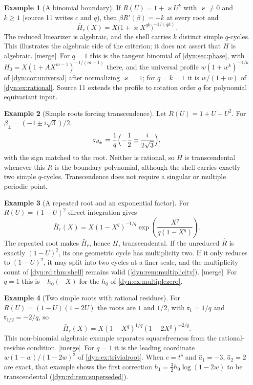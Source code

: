 \documentclass[11pt,letterpaper]{article}
\theoremstyle{definition}
\newtheorem{example}[example]{Example}
\theoremstyle{remark}
\newcommand{\mergetag}{\textup{\textsf{\small[merge]}}}%
\numberwithin{equation}{section}
\begin{document}
\begin{example}[A binomial boundary]\label{dyn:rd:ex:binomial}
If $R(U)=1+\varkappa U^{k}$ with $\varkappa\ne0$ and $k\ge1$ (source 11
writes $c$ and $q$), then $\beta R'(\beta)=-k$ at every root and
\[
 \bar H_r(X)=X\bigl(1+\varkappa X^{qk}\bigr)^{-1/(qk)} .
\]
The reduced linearizer is algebraic, and the shell carries $k$ distinct
simple $q$-cycles. This illustrates the algebraic side of the criterion; it
does not assert that $H$ is algebraic. \mergetag\ For $q=1$ this is the
tangent binomial of \cref{dyn:sec:phase}, with $H_0=X(1+AX^{m-1})^{-1/(m-1)}$
there, and the universal profile $w(1+w^{k})^{-1/k}$ of
\cref{dyn:cor:universal} after normalizing $\varkappa=1$; for $q=k=1$ it is
$w/(1+w)$ of \cref{dyn:ex:rational}. Source 11 extends the profile to
rotation order $q$ for polynomial equivariant input.
\end{example}

\begin{example}[Simple roots forcing transcendence]
\label{dyn:rd:ex:quadraticR}
Let $R(U)=1+U+U^{2}$. For $\beta_\pm=(-1\pm i\sqrt3)/2$,
\[
 \mathfrak r_{\beta_\pm}=\frac1q\Bigl(-\frac12\pm\frac{i}{2\sqrt3}\Bigr),
\]
with the sign matched to the root. Neither is rational, so $H$ is
transcendental whenever this $R$ is the boundary polynomial, although the
shell carries exactly two simple $q$-cycles. Transcendence does not require
a singular or multiple periodic point.
\end{example}

\begin{example}[A repeated root and an exponential factor]
\label{dyn:rd:ex:repeated}
For $R(U)=(1-U)^{2}$ direct integration gives
\[
 \bar H_r(X)=X(1-X^{q})^{-1/q}\exp\left(\frac{X^{q}}{q(1-X^{q})}\right).
\]
The repeated root makes $\bar H_r$, hence $H$, transcendental. If the
unreduced $\widehat R$ is exactly $(1-U)^{2}$, its one geometric cycle has
multiplicity two. If it only reduces to $(1-U)^{2}$, it may split into two
cycles at a finer scale, and the multiplicity count of
\cref{dyn:rd:thm:shell} remains valid (\cref{dyn:rem:multiplicity}).
\mergetag\ For $q=1$ this is $-h_0(-X)$ for the $h_0$ of
\cref{dyn:ex:multiplezero}.
\end{example}

\begin{example}[Two simple roots with rational residues]
\label{dyn:rd:ex:tworoots}
For $R(U)=(1-U)(1-2U)$ the roots are $1$ and $1/2$, with
$\mathfrak r_1=1/q$ and $\mathfrak r_{1/2}=-2/q$, so
\[
 \bar H_r(X)=X(1-X^{q})^{1/q}(1-2X^{q})^{-2/q} .
\]
This non-binomial algebraic example separates squarefreeness from the
rational-residue condition. \mergetag\ For $q=1$ it is the leading
coordinate $w(1-w)/(1-2w)^{2}$ of \cref{dyn:ex:trivialroot}. When
$e=t^{\delta}$ and $\hat a_1=-3$, $\hat a_2=2$ are exact, that example
shows the first correction $h_1=\tfrac32h_0\log(1-2w)$ to be transcendental
(\cref{dyn:rd:rem:superseded}).
\end{example}
\end{document}
